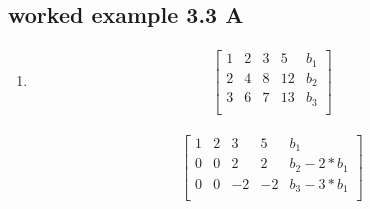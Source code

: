 \documentclass[a4paper,11pt]{article}
\begin{document}
\subsection*{worked example 3.3 A}
\begin{enumerate}
\item
\begin{align}
\left[
\begin{array}{cccc|c}
1 & 2 & 3 & 5 & b_1 \\
2 & 4 & 8 & 12 & b_2  \\
3 & 6 & 7 & 13 & b_3 \\
\end{array}
\right]
\end{align}

\begin{align}
\left[
\begin{array}{cccc|c}
1 & 2 & 3 & 5 & b_1 \\
0 & 0 & 2 & 2 & b_2-2*b_1  \\
0 & 0 & -2 & -2 & b_3-3*b_1 \\
\end{array}
\right]
\end{align}


\end{enumerate}
\end{document}
